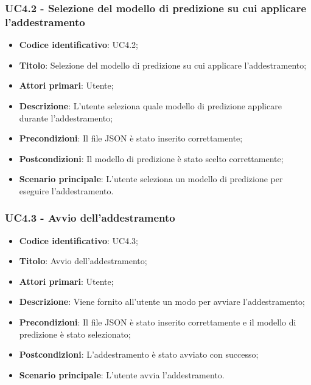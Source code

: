 \subsubsection{UC4.2 - Selezione del modello di predizione su cui applicare l'addestramento}
\begin{itemize}
    \item \textbf{Codice identificativo}: UC4.2;
    \item \textbf{Titolo}: Selezione del modello di predizione su cui applicare l'addestramento;
    \item \textbf{Attori primari}: Utente;
    \item \textbf{Descrizione}: L'utente seleziona quale modello di predizione applicare durante l'addestramento;
    \item \textbf{Precondizioni}: Il file JSON è stato inserito correttamente;
    \item \textbf{Postcondizioni}: Il modello di predizione è stato scelto correttamente;
    \item \textbf{Scenario principale}: L'utente seleziona un modello di predizione per eseguire l'addestramento.   
\end{itemize}

\subsubsection{UC4.3 - Avvio dell'addestramento}
\begin{itemize}
    \item \textbf{Codice identificativo}: UC4.3;
    \item \textbf{Titolo}: Avvio dell'addestramento;
    \item \textbf{Attori primari}: Utente;
    \item \textbf{Descrizione}: Viene fornito all'utente un modo per avviare l'addestramento;
    \item \textbf{Precondizioni}: Il file JSON è stato inserito correttamente e il modello di predizione è stato selezionato;
    \item \textbf{Postcondizioni}: L'addestramento è stato avviato con successo;
    \item \textbf{Scenario principale}: L'utente avvia l'addestramento.
\end{itemize}

